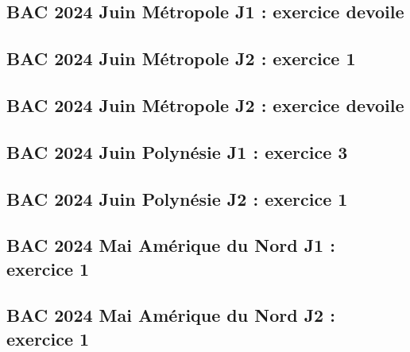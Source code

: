 \documentclass[lang=fr,edition=teacher,layout=sheet]{mxbook}
\begin{document}
\begingroup\endgroup
\par\bigskip
{}\subsection*{BAC 2024 Juin Métropole J1 : exercice devoile}
\begingroup\endgroup
\par\bigskip
{}\subsection*{BAC 2024 Juin Métropole J2 : exercice 1}
\begingroup\endgroup
\par\bigskip
{}\subsection*{BAC 2024 Juin Métropole J2 : exercice devoile}
\begingroup\endgroup
\par\bigskip
{}\subsection*{BAC 2024 Juin Polynésie J1 : exercice 3}
\begingroup\endgroup
\par\bigskip
{}\subsection*{BAC 2024 Juin Polynésie J2 : exercice 1}
\begingroup\endgroup
\par\bigskip
{}\subsection*{BAC 2024 Mai Amérique du Nord J1 : exercice 1}
\begingroup\endgroup
\par\bigskip
{}\subsection*{BAC 2024 Mai Amérique du Nord J2 : exercice 1}
\end{document}
